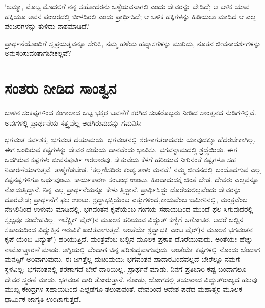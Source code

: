 \vskip 2pt

‘ಅಮ್ಮಾ, ಮೊಟ್ಟ ಮೊದಲಿಗೆ ನನ್ನ ಸಹೋದರನು ಒಳ್ಳೆಯವನಾಗಲಿ ಎಂದು ದೇವರನ್ನು ಬೇಡಿದೆ; ಆ ಬಳಿಕ ಯಾವ ಹಕ್ಕಿಯೂ ಅವನ ಪಂಜರದಲ್ಲಿ ಬೀಳದಿರಲಿ ಎಂದು ಪ್ರಾರ್ಥಿಸಿದೆ; ಆ ಬಳಿಕ ಹಕ್ಕಿಗಳನ್ನು ಹಿಡಿಯಲು ಮಾಡಿದ ಆ ಎಲ್ಲ ಪಂಜರಗಳನ್ನು ತುಳಿದು ನಾಶಮಾಡಿದೆ.’

\vskip 2pt

ಪ್ರಾರ್ಥನೆಯೊಂದಿಗೆ ಸ್ವಪ್ರಯತ್ನವನ್ನೂ ಸೇರಿಸಿ, ನಮ್ಮ ಹಳೆಯ ಹವ್ಯಾಸಗಳನ್ನು ಮುರಿದು, ನೂತನ ಜೀವನಾದರ್ಶಗಳನ್ನು ಅನುಸರಿಸುವಂತಾಗಬೇಕಲ್ಲವೆ?


\section*{ಸಂತರು ನೀಡಿದ ಸಾಂತ್ವನ}


ಬಾಳಿನ ಸಂಕಷ್ಟಗಳಿಂದ ಕಂಗಾಲಾದ ಒಬ್ಬ ಭಕ್ತರ ಬವಣೆಗೆ ಕರಗಿದ ಸಂತರೊಬ್ಬರು ನೀಡಿದ ಸಾಂತ್ವನದ ನುಡಿಗಳಿಲ್ಲಿವೆ. ಅವುಗಳಲ್ಲಿ ಪ್ರಾರ್ಥನೆಯ ಸತ್ತ್ವವೆಲ್ಲ ಅಡಗಿರುವುದನ್ನು ಗಮನಿಸಿ:

\vskip 2pt

ಭಗವಂತ ಸರ್ವಶಕ್ತ, ಭಗವಂತ ದಯಾಮಯ. ಭಗವಂತನಲ್ಲಿ ಶರಣಾಗತರಾದವರು ಯಾವುದಕ್ಕೂ ಹೆದರಬೇಕಾಗಿಲ್ಲ. ಈಗ ಬಂದಿರುವ ಕಷ್ಟಗಳನ್ನು ದೇವರ ದಯೆಯ ದಾನವೆಂದು ಭಾವಿಸು. ಭಗವನ್ನಾಮದಲ್ಲಿ ಶ್ರದ್ಧೆಯಿಡು. ಈಗ ಒದಗಿರುವ ಕಷ್ಟಗಳು ಜೀವನಪೂರ್ತಿ ಇರಲಾರವು. ಸೇತುವೆಯ ಕೆಳಗೆ ಹರಿಯುವ ನೀರಿನಂತೆ ಕಷ್ಟಗಳೂ ಸಹ ನಿವಾರಣೆಯಾಗುತ್ತವೆ. ತಾಳ್ಮೆಗೆಡಬೇಡ. ‘ತಲ್ಲಣಿಸದಿರು ಕಂಡ್ಯ ತಾಳು ಮನವೆ.’ ನಮ್ಮ ಜೀವನದಲ್ಲಿ ಬಂದೊದಗುವ ಎಲ್ಲ ಕಷ್ಟನಷ್ಟಗಳಿಗೂ ಅರ್ಥವುಂಟು. ಕಾರ್ಯಕಾರಣ ಸಂಬಂಧ ಉಂಟು. ಹಿಂದಾದುದಕ್ಕೆ ಚಿಂತೆ ಬೇಡ. ದೇವರು ಎಲ್ಲವನ್ನೂ ನೋಡುತ್ತಿದ್ದಾನೆ. ನಿನ್ನ ಎಲ್ಲ ಪ್ರಾರ್ಥನೆಯನ್ನೂ ಕೇಳು ತ್ತಿದ್ದಾನೆ. ಪ್ರಾರ್ಥಿಸಿದ್ದು ದೊರೆಯಲಿಲ್ಲವೆಂದು ದೇವರನ್ನು ದೂರಬೇಡ; ಪ್ರಾರ್ಥನೆಗೆ ಫಲ ಉಂಟು. ಶ್ರದ್ಧಾಭಕ್ತಿಯೆಂಬ ಎತ್ತುಗಳಿಂದ,ಕಾಯವೆಂಬ ಜಮೀನಿನಲ್ಲಿ, ಮಂತ್ರವೆಂಬ ನೇಗಿಲಿನಿಂದ ಉಳುಮೆ ಮಾಡಿದಲ್ಲಿ, ಭಗವಂತನ ಕೃಪೆಯೆಂಬ ಗಂಗೆಯ ಸಹಾಯದಿಂದ ಮುಂದೆ ಫಲ ಸಿಗುವುದರಲ್ಲಿ ಸ್ವಲ್ಪವೂ ಸಂದೇಹವಿಲ್ಲ. ಇಲೆಕ್ಟ್ರಿಕ್ ವೈರ್​)ನ ಮೂಲಕ ಹರಿಯುವ ವಿದ್ಯುತ್ ಕಣ್ಣಿಗೆ ಅಗೋಚರ. ಆದರೆ ಬಲ್ಬಿನ ಸಹಾಯದಿಂದ ವಿದ್ಯುತ್ತಿನ ಇರುವಿಕೆ ಖಚಿತವಾಗುತ್ತದೆ. ಅಂತೆಯೇ ಶ್ರದ್ಧಾಭಕ್ತಿ ಎಂಬ ವೈರ್​)ನ ಮೂಲಕ ಭಗವಂತನ ಕೃಪೆ ಯೆಂಬ ವಿದ್ಯುತ್​) ಹರಿಯುತ್ತಿದೆ. ಮಂತ್ರವೆಂಬ ಬಲ್ಬಿನ ಮೂಲಕ ಪ್ರಕಾಶ ದೊರೆಯುವುದು. ಅಂತೆಯೇ ಹೆಚ್ಚು ನಾಮೋಚ್ಚಾರಣೆ ಮಾಡು. ಅಗ್ನಿಯಲ್ಲಿ ಬೆಂದಾಗ ಚಿನ್ನ ಪರಿಶುದ್ಧವಾಗುವುದು. ಅಂತೆಯೇ ಕಷ್ಟಗಳಲ್ಲಿ ನೊಂದು ಬೆಂದಾಗ ಮನಸ್ಸಿಗೆ ಅರಿವಾಗುವುದು, ಈ ಜಗತ್ತೆಲ್ಲ ದುಃಖಮಯ; ಭಗವಂತನ ಪಾದಾರವಿಂದವಲ್ಲದೆ ಬೇರೆಲ್ಲೂ ನಮಗೆ ಸ್ಥಳವಿಲ್ಲ; ಭಗವಂತನಲ್ಲಿ ಶರಣಾಗದೆ ಬೇರೆ ದಾರಿಯಿಲ್ಲ. ಪ್ರಾರ್ಥನೆ ಮಾಡು. ನಿನಗೆ ಪ್ರತಿಬಾರಿ ಕಷ್ಟ ಬಂದಾಗಲೂ ದೇವರ ಸ್ಮರಣೆ ಮಾಡು. ಭಗವಂತ ದಾರಿ ತೋರುತ್ತಾನೆ. ನೋಡು, ಜೋಗದಲ್ಲಿ ತಯಾರಾದ ವಿದ್ಯುತ್​ರಾಜ್ಯದ ಹಲವು ಮುಖ್ಯ ಕೇಂದ್ರಗಳ ಸಹಾಯದಿಂದ ಎಲ್ಲೆಡೆಗೂ ತಲುಪುವಂತೆ, ದೇವರಿಂದ ಆದೇಶ ಪಡೆದ ಮಹಾತ್ಮರ ಮೂಲಕ ಧಾರ್ಮಿಕ ಜಾಗೃತಿ ಉಂಟಾಗುತ್ತದೆ.

